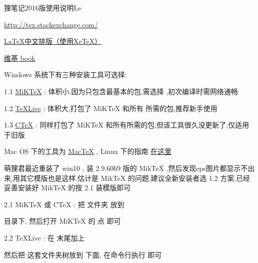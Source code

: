 \documentclass{lenote}
\begin{document}
\begin{lecover}{狸笔记}{{2016}版使用说明}{Le}




\url{http://tex.stackexchange.com/ }

\href{http://linux-wiki.cn/wiki/zh-hans/LaTeX%E4%B8%AD%E6%96%87%E6%8E%92%E7%89%88%EF%BC%88%E4%BD%BF%E7%94%A8XeTeX%EF%BC%89 }{ LaTeX中文排版（使用XeTeX）}

\href{http://www.wikibooks.org }{维基 book}

\end{lecover}





Windows 系统下有三种安装工具可选择:

1.1 \href{http://miktex.org/download}{MiKTeX} :
体积小,因为只包含最基本的包,需选择  ,初次编译时需网络通畅

1.2 \href{http://www.ctan.org/tex-archive/systems/texlive/Images/ }{TeXLive} :
体积大,打包了 MiKTeX 和所有 \LeNote 所需的包,推荐新手使用

1.3 \href{http://www.ctex.org/CTeXDownload }{CTeX} :
同样打包了 MiKTeX 和所有所需的包,但该工具很久没更新了,仅适用于旧版 \LeNote

Mac OS 下的工具为 \href{http://tug.org/cgi-bin/mactex-download/MacTeX.pkg}{MacTeX}  , Linux 下的指南 \href{https://github.com/LePtC/LeNote/issues/2}{在这里}


{\small
\sub 萌狸君最近重装了 win10 , 装 2.9.6069 版的 MikTeX ,然后发现eps图片都显示不出来,用其它模版也是这样,估计是 MikTeX 的问题,建议全新安装者选 1.2 方案,已经妥善安装好 MikTeX 的按 2.1 装模版即可
} \\


2.1 MiKTeX 或 CTeX :
把  文件夹  放到

 目录下,
然后打开 MiKTeX 的  点  即可

2.2 TeXLive :
在  末尾加上


然后把  这套文件夹树放到  下面,
在命令行执行  即可
\end{document}
